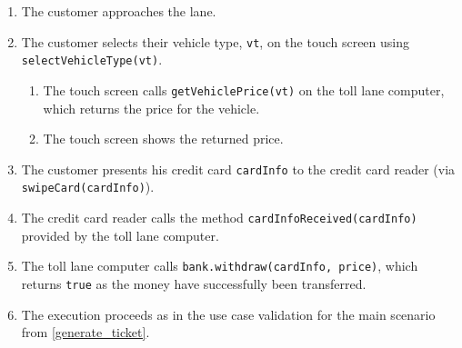 \begin{enumerate}
\item The customer approaches the lane.
\item The customer selects their vehicle type, \texttt{vt}, on the touch screen using \texttt{selectVehicleType(vt)}.
	\begin{enumerate}
	\item The touch screen calls \texttt{getVehiclePrice(vt)} on the toll lane computer, which returns the price for the vehicle.
	\item The touch screen shows the returned price.
	\end{enumerate}
\item The customer presents his credit card \texttt{cardInfo} to the credit card reader (via \texttt{swipeCard(cardInfo)}).
	\item The credit card reader calls the method \texttt{cardInfoReceived(cardInfo)} provided by the toll lane computer.
		\item The toll lane computer calls \texttt{bank.withdraw(cardInfo, price)}, which returns \texttt{true} as the money have successfully been transferred.
		\item The execution proceeds as in the use case validation for the main scenario from \autoref{generate_ticket}.
		
	
\end{enumerate}